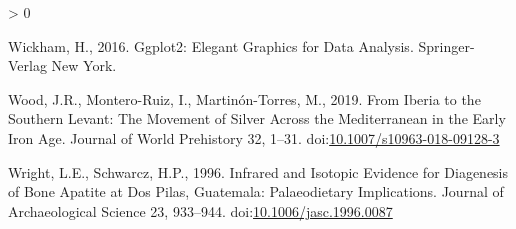 \documentclass[5p]{elsarticle} %
\newlength{\cslhangindent}
\newenvironment{CSLReferences}[2] %
 {%
  \setlength{\parindent}{0pt}
  \ifodd #1 \everypar{\setlength{\hangindent}{\cslhangindent}}\ignorespaces\fi
  \ifnum #2 > 0
  \setlength{\parskip}{#2\baselineskip}
  \fi
 }%
 {}
\begin{document}
\begin{CSLReferences}{1}{0}
\leavevmode\hypertarget{ref-wickham16}{}%
Wickham, H., 2016. Ggplot2: {Elegant Graphics} for {Data Analysis}. {Springer-Verlag New York}.

\leavevmode\hypertarget{ref-wood_etal19}{}%
Wood, J.R., Montero-Ruiz, I., Martinón-Torres, M., 2019. From {Iberia} to the {Southern Levant}: {The Movement} of {Silver Across} the {Mediterranean} in the {Early Iron Age}. Journal of World Prehistory 32, 1--31. doi:\href{https://doi.org/10.1007/s10963-018-09128-3}{10.1007/s10963-018-09128-3}

\leavevmode\hypertarget{ref-wright_schwarcz96}{}%
Wright, L.E., Schwarcz, H.P., 1996. Infrared and {Isotopic Evidence} for {Diagenesis} of {Bone Apatite} at {Dos Pilas}, {Guatemala}: {Palaeodietary Implications}. Journal of Archaeological Science 23, 933--944. doi:\href{https://doi.org/10.1006/jasc.1996.0087}{10.1006/jasc.1996.0087}

\end{CSLReferences}
\end{document}
